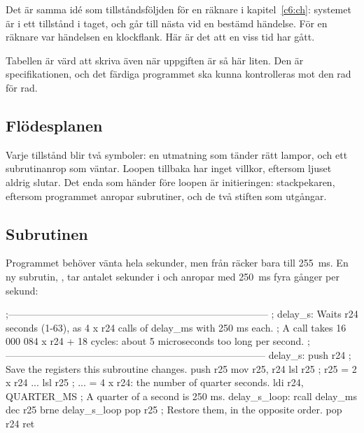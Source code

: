 \noindent Det är samma idé som tillståndsföljden för en räknare i kapitel~\ref{c6:ch}: systemet är
i ett tillstånd i taget, och går till nästa vid en bestämd händelse. För en räknare var händelsen
en klockflank. Här är det att en viss tid har gått.

Tabellen är värd att skriva även när uppgiften är så här liten. Den är specifikationen, och det
färdiga programmet ska kunna kontrolleras mot den rad för rad.

\subsection{Flödesplanen}
\label{c11:b3}


\noindent Varje tillstånd blir två symboler: en utmatning som tänder rätt lampor, och ett
subrutinanrop som väntar. Loopen tillbaka har inget villkor, eftersom ljuset aldrig slutar. Det
enda som händer före loopen är initieringen: stackpekaren, eftersom programmet anropar subrutiner,
och de två stiften som utgångar.

\subsection{Subrutinen }
\label{c11:b4}
Programmet behöver vänta hela sekunder, men  från  räcker bara till
255~ms. En ny subrutin, , tar antalet sekunder i  och anropar
 med 250~ms fyra gånger per sekund:

\begin{asmcode}
;--------------------------------------------------------------------------------
; delay_s: Waits r24 seconds (1-63), as 4 x r24 calls of delay_ms with 250 ms each.
; A call takes 16 000 084 x r24 + 18 cycles: about 5 microseconds too long per second.
;--------------------------------------------------------------------------------
delay_s:
    push r24                        ; Save the registers this subroutine changes.
    push r25
    mov r25, r24
    lsl r25                         ; r25 = 2 x r24 ...
    lsl r25                         ; ... = 4 x r24: the number of quarter seconds.
    ldi r24, QUARTER_MS             ; A quarter of a second is 250 ms.
delay_s_loop:
    rcall delay_ms
    dec r25
    brne delay_s_loop
    pop r25                         ; Restore them, in the opposite order.
    pop r24
    ret
\end{asmcode}

